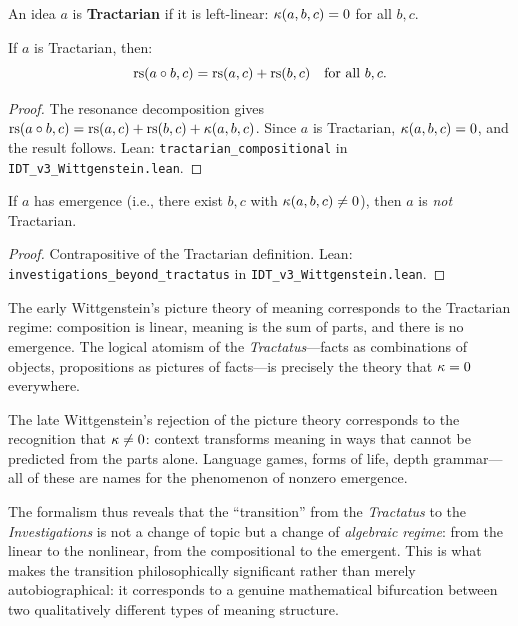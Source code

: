 \begin{definition}
\label{def:tractarian}
An idea $a$ is \textbf{Tractarian} if it is left-linear: $\kappa(a, b, c) = 0$
for all $b, c$.
\end{definition}

\begin{theorem}
\label{thm:tractarian-comp}
If $a$ is Tractarian, then:
\[
\mathrm{rs}(a \circ b, c) = \mathrm{rs}(a, c) + \mathrm{rs}(b, c) \quad \text{for all } b, c.
\]
\end{theorem}

\begin{proof}
The resonance decomposition gives $\mathrm{rs}(a \circ b, c) = \mathrm{rs}(a,c) + \mathrm{rs}(b,c)
+ \kappa(a,b,c)$. Since $a$ is Tractarian, $\kappa(a,b,c) = 0$, and the
result follows.
Lean: \texttt{tractarian\_compositional} in \texttt{IDT\_v3\_Wittgenstein.lean}.
\end{proof}

\begin{theorem}
\label{thm:investigations-beyond}
If $a$ has emergence (i.e., there exist $b, c$ with $\kappa(a, b, c) \neq 0$),
then $a$ is \emph{not} Tractarian.
\end{theorem}

\begin{proof}
Contrapositive of the Tractarian definition.
Lean: \texttt{investigations\_beyond\_tractatus} in
\texttt{IDT\_v3\_Wittgenstein.lean}.
\end{proof}

\begin{interpretation}
The early Wittgenstein's picture theory of meaning corresponds to the Tractarian
regime: composition is linear, meaning is the sum of parts, and there is no
emergence. The logical atomism of the \textit{Tractatus}---facts as combinations
of objects, propositions as pictures of facts---is precisely the theory that
$\kappa = 0$ everywhere.

The late Wittgenstein's rejection of the picture theory corresponds to the
recognition that $\kappa \neq 0$: context transforms meaning in ways that
cannot be predicted from the parts alone. Language games, forms of life, depth
grammar---all of these are names for the phenomenon of nonzero emergence.

The formalism thus reveals that the ``transition'' from the \textit{Tractatus}
to the \textit{Investigations} is not a change of topic but a change of
\emph{algebraic regime}: from the linear to the nonlinear, from the compositional
to the emergent. This is what makes the transition philosophically significant
rather than merely autobiographical: it corresponds to a genuine mathematical
bifurcation between two qualitatively different types of meaning structure.
\end{interpretation}

